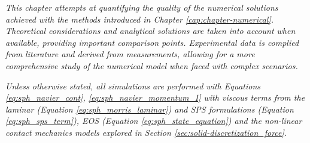 
\label{cap:chapter_validation}

\textit{This chapter attempts at quantifying the quality of the numerical solutions achieved with the methods introduced in Chapter \ref{cap:chapter-numerical}. Theoretical considerations and analytical solutions are taken into account when available, providing important comparison points. Experimental data is complied from literature and derived from measurements, allowing for a more comprehensive study of the numerical model when faced with complex scenarios.}

\textit{Unless otherwise stated, all simulations are performed with Equations \eqref{eq:sph_navier_cont}, \eqref{eq:sph_navier_momentum_I} with viscous terms from the laminar (Equation \ref{eq:sph_morris_laminar}) and SPS formulations (Equation \ref{eq:sph_sps_term}), \ac{EOS} (Equation \ref{eq:sph_state_equation}) and the non-linear contact mechanics models explored in Section \ref{sec:solid-discretization_force}.}




